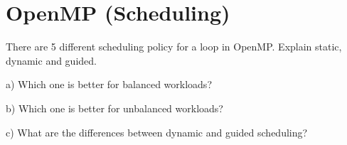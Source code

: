 \section{OpenMP (Scheduling)}
%

There are 5 different scheduling policy for a loop in OpenMP.
Explain static, dynamic and guided.

\vspace{2mm}

a) Which one is better for balanced workloads?

b) Which one is better for unbalanced workloads?

c) What are the differences between dynamic and guided scheduling?
